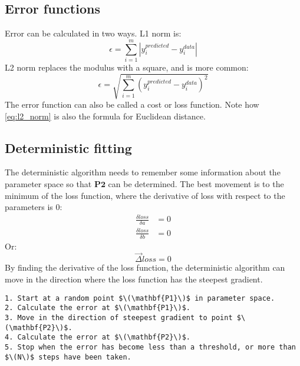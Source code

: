 \subsection{Error functions}
Error can be calculated in two ways. L1 norm is:
\begin{equation*}
    \epsilon = \sum_{i=1}^{m}|y_i^{predicted} - y_i^{data}|
\end{equation*}
L2 norm replaces the modulus with a square, and is more common:
\begin{equation}
    \label{eq:l2_norm}
    \epsilon = \sqrt{\sum_{i=1}^{m}(y_i^{predicted} - y_i^{data})^2}
\end{equation}
The error function can also be called a cost or loss function. Note how \cref{eq:l2_norm} is also the formula for Euclidean distance.

\subsection{Deterministic fitting}
The deterministic algorithm needs to remember some information about the parameter space so that \(\mathbf{P2}\) can be determined. The best movement is to the minimum of the loss function, where the derivative of loss with respect to the parameters is 0:
\begin{align*}
    \frac{\delta loss}{\delta a} & = 0 \\
    \frac{\delta loss}{\delta b} & = 0
\end{align*}
Or:
\begin{equation*}
    \vec{\Delta} loss = 0
\end{equation*}
By finding the derivative of the loss function, the deterministic algorithm can move in the direction where the loss function has the steepest gradient.

\begin{lstlisting}
1. Start at a random point $\(\mathbf{P1}\)$ in parameter space.
2. Calculate the error at $\(\mathbf{P1}\)$.
3. Move in the direction of steepest gradient to point $\(\mathbf{P2}\)$.
4. Calculate the error at $\(\mathbf{P2}\)$.
5. Stop when the error has become less than a threshold, or more than $\(N\)$ steps have been taken.
\end{lstlisting}
